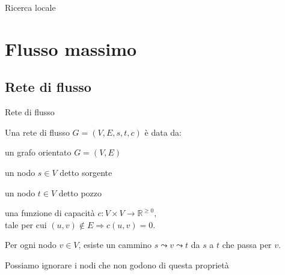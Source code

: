 \begin{frame}{Ricerca locale}

\vspace{-9pt}
\begin{center}
\end{center}

\end{frame}


\section{Flusso massimo}

\subsection{Rete di flusso}

\begin{frame}{Rete di flusso}

\vspace{-9pt}
\begin{myboxtitle}[Definizione]
Una \alert{rete di flusso $G=(V,E,s,t,c)$} è data da:
\BI
\item un grafo orientato $G=(V,E)$
\item un nodo $s \in V$ detto \alert{sorgente}
\item un nodo $t \in V$ detto \alert{pozzo}
\item una funzione di \alert{capacità} $c: V \times V \rightarrow \mathbb{R}^{\geq 0}$,\\
tale per cui $(u,v) \not \in E \Rightarrow c(u,v)=0$.
\EI
\end{myboxtitle}

\begin{myboxtitle}[Assunzioni]
\BIL
\item Per ogni nodo $v \in V$, esiste un cammino $s \leadsto v \leadsto t$ 
da $s$ a $t$ che passa per $v$.
\item Possiamo ignorare i nodi che non godono di questa proprietà
\EIL
\end{myboxtitle}

\end{frame}

